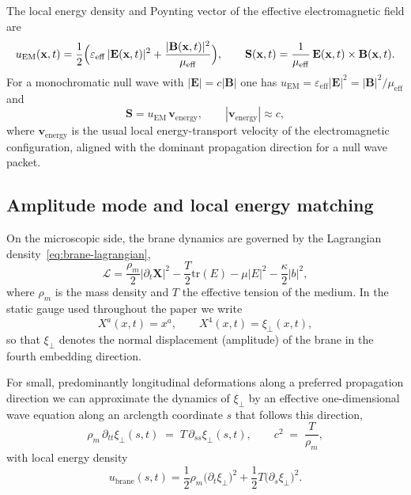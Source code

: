 The local energy density and Poynting vector of the effective
electromagnetic field are
\begin{equation}
  u_{\mathrm{EM}}(\mathbf x,t)
  = \frac{1}{2}\Bigl(
      \varepsilon_{\mathrm{eff}}\,|\mathbf E(\mathbf x,t)|^2
      + \frac{|\mathbf B(\mathbf x,t)|^2}{\mu_{\mathrm{eff}}}
    \Bigr),
  \qquad
  \mathbf S(\mathbf x,t)
  = \frac{1}{\mu_{\mathrm{eff}}}\,\mathbf E(\mathbf x,t)\times\mathbf B(\mathbf x,t).
  \label{eq:app-u-S}
\end{equation}
For a monochromatic null wave with $|\mathbf E| = c|\mathbf B|$ one has
$u_{\mathrm{EM}} = \varepsilon_{\mathrm{eff}}|\mathbf E|^2
                 = |\mathbf B|^2/\mu_{\mathrm{eff}}$
and
\begin{equation}
  \mathbf S
  = u_{\mathrm{EM}}\,\mathbf v_{\mathrm{energy}},
  \qquad
  |\mathbf v_{\mathrm{energy}}| \approx c,
\end{equation}
where $\mathbf v_{\mathrm{energy}}$ is the usual local energy-transport
velocity of the electromagnetic configuration, aligned with the
dominant propagation direction for a null wave packet.

\subsection{Amplitude mode and local energy matching}
\label{app:inverse-amplitude}

On the microscopic side, the brane dynamics are governed by the
Lagrangian density~\eqref{eq:brane-lagrangian},
\begin{equation}
  \mathcal{L}
  = \frac{\rho_m}{2}|\partial_t\mathbf X|^2
    - \frac{T}{2}\mathrm{tr}(E)
    - \mu |E|^2
    - \frac{\kappa}{2}|b|^2,
\end{equation}
where $\rho_m$ is the mass density and $T$ the effective tension of the
medium. In the static gauge used throughout the paper we write
\begin{equation}
  X^a(x,t) = x^a, \qquad X^4(x,t) = \xi_\perp(x,t),
\end{equation}
so that $\xi_\perp$ denotes the normal displacement (amplitude) of the
brane in the fourth embedding direction.

For small, predominantly longitudinal deformations along a preferred
propagation direction we can approximate the dynamics of $\xi_\perp$ by
an effective one-dimensional wave equation along an arclength coordinate
$s$ that follows this direction,
\begin{equation}
  \rho_m\,\partial_{tt}\xi_\perp(s,t)
  \;=\;
  T\,\partial_{ss}\xi_\perp(s,t),
  \qquad
  c^2
  \;=\;
  \frac{T}{\rho_m},
  \label{eq:app-1d-wave}
\end{equation}
with local energy density
\begin{equation}
  u_{\mathrm{brane}}(s,t)
  = \frac{1}{2}\rho_m\bigl(\partial_t\xi_\perp\bigr)^2
    + \frac{1}{2}T\bigl(\partial_s\xi_\perp\bigr)^2.
  \label{eq:app-u-brane}
\end{equation}

